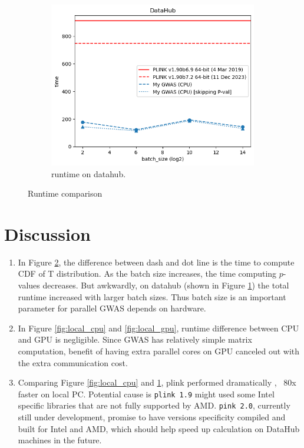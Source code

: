 \documentclass{article}
\begin{document}
\begin{figure}[h]
      \begin{subfigure}[b]{0.32\textwidth}
            \includegraphics[width=\textwidth]{../datahub.png}
            \caption{\label{fig:datahub}runtime on datahub.}
      \end{subfigure}
      
      \caption{\label{fig:runtime}Runtime comparison}
  \end{figure}


\section{Discussion}
\begin{enumerate}
\item In Figure \ref*{fig:runtime},
the difference between dash and dot line is the time to compute CDF of T distribution.
As the batch size increases, the time computing $p$-values decreases.
But awkwardly, on datahub (shown in Figure \ref*{fig:datahub}) 
the total runtime increased with larger batch sizes.
Thus batch size is an important parameter for parallel GWAS depends on hardware.

\item In Figure \ref*{fig:local_cpu} and \ref*{fig:local_gpu},
runtime difference between CPU and GPU is negligible.
Since GWAS has relatively simple matrix computation,
benefit of having extra parallel cores on GPU 
canceled out with the extra communication cost.

\item Comparing Figure \ref*{fig:local_cpu} and \ref*{fig:datahub},
plink performed dramatically , ~80x faster on local PC.
Potential cause is \texttt{plink 1.9} might used some Intel specific libraries
that are not fully supported by AMD.
\texttt{pink 2.0}, currently still under development, promise to have versions specificity compiled and built for Intel and AMD, 
which should help speed up calculation on DataHub machines in the future.

\end{enumerate}
\end{document}
